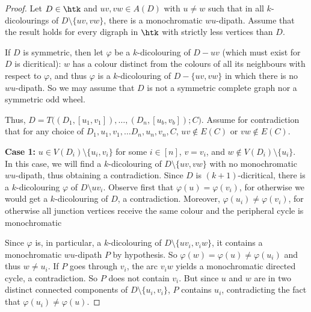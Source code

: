\begin{proof}
    Let $D \in \htk$ and $uv, vw \in A(D)$ with $u \neq w$ such that in all $k$-dicolourings of $D \setminus \{uv, vw\}$, there is a monochromatic $wu$-dipath. Assume that the result holds for every digraph in $\htk$ with strictly less vertices than $D$.

    If $D$ is symmetric, then let $\varphi$ be a $k$-dicolouring of $D - uv$ (which must exist for $D$ is dicritical): $w$ has a colour distinct from the colours of all its neighbours with respect to $\varphi$, and thus $\varphi$ is a $k$-dicolouring of $D - \{uv,vw\}$ in which there is no $wu$-dipath. So we may assume that $D$ is not a symmetric complete graph nor a symmetric odd wheel.
    

 
    Thus, $D=T\big((D_1, [u_1,v_1]), \dots, (D_n, [u_b,v_b]);C\big)$. %
    Assume for contradiction that for any choice of $D_1, u_1, v_1, \dots D_n, u_n, v_n, C$, $uv \notin E(C)$ or $vw \notin E(C)$. 

     \noindent\textbf{Case 1:} $u \in V(D_i) \setminus \{u_i,v_i\}$ for some $i \in[n]$, $v=v_i$, and $w \notin V(D_i) \setminus \{u_i\}$. \\ 
     In this case, we will find a $k$-dicolouring of $D\setminus \{uv,vw\}$ with no monochromatic $wu$-dipath, thus obtaining a contradiction. 
    Since $D$ is $(k+1)$-dicritical, there is a $k$-dicolouring $\varphi$  of $D \setminus uv_i$. Observe first that $\varphi(u) = \varphi(v_i)$, for otherwise we would get a $k$-dicolouring of $D$, a contradiction. 
    Moreover, $\varphi(u_i) \neq \varphi(v_i)$, for otherwise all junction vertices receive the same colour and the peripheral cycle is monochromatic %


    Since $\varphi$ is, in particular, a $k$-dicolouring of $D\setminus \{uv_i,v_iw\}$, it contains a monochromatic $wu$-dipath $P$ by hypothesis. 
    So $\varphi(w)=\varphi(u) \neq \varphi(u_i)$ and thus $w \neq u_i$. 
    If $P$ goes through $v_i$, the arc $v_iw$ yields a monochromatic directed cycle, a contradiction. So $P$ does not contain $v_i$. But since $u$ and $w$ are in two distinct connected components of  $D\setminus \{u_i,v_i\}$, $P$ contains $u_i$, contradicting the fact that $\varphi(u_i) \neq \varphi(u)$.  
    \medskip 


\end{proof}
